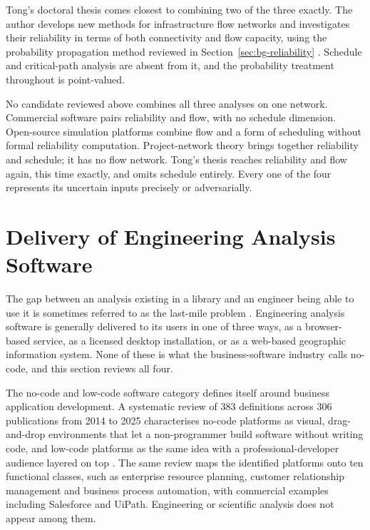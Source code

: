 \documentclass[12pt]{report}
\begin{document}
Tong's doctoral thesis comes closest to combining two of the three exactly. The author
develops new methods for infrastructure flow networks and investigates their reliability in
terms of both connectivity and flow capacity, using the probability propagation method
reviewed in Section~\ref{sec:bg-reliability} \cite{tong2021infrastructure}.
Schedule and critical-path analysis are absent from it, and the probability treatment
throughout is point-valued.

No candidate reviewed above combines all three analyses on one network. Commercial software
pairs reliability and flow, with no schedule dimension. Open-source simulation platforms
combine flow and a form of scheduling without formal reliability computation. Project-network
theory brings together reliability and schedule; it has no flow network. Tong's thesis
reaches reliability and flow again, this time exactly, and omits schedule entirely. Every
one of the four represents its uncertain inputs precisely or adversarially.

\section{Delivery of Engineering Analysis Software}
\label{sec:bg-delivery}

The gap between an analysis existing in a library and an engineer being able to use it is
sometimes referred to as the last-mile problem \cite{hannay2009scientists,prabhu2011survey}.
Engineering analysis software is generally delivered to its users in one of three ways, as a
browser-based service, as a licensed desktop installation, or as a web-based geographic
information system. None of these is what the business-software industry calls no-code, and
this section reviews all four.

The no-code and low-code software category defines itself around business application
development. A systematic review of 383 definitions across 306 publications from 2014 to 2025
characterises no-code platforms as visual, drag-and-drop environments that let a non-programmer
build software without writing code, and low-code platforms as the same idea with a
professional-developer audience layered on top \cite{abendroth2026democratization}. The same review maps the identified platforms onto ten functional classes, such as
enterprise resource planning, customer relationship management and business process
automation, with commercial examples including Salesforce and UiPath. Engineering or
scientific analysis does not appear among them.
\end{document}

